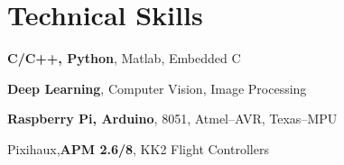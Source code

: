 \halfblankline

\section{Technical Skills}
\begin{innerlist}
    \item \textbf{C/C++, Python}, Matlab, Embedded C
    \item \textbf{Deep Learning}, Computer Vision, Image Processing
    \item \textbf{Raspberry Pi, Arduino}, 8051, Atmel--AVR, Texas--MPU
    \item Pixihaux,\textbf{APM 2.6/8}, KK2 Flight Controllers
\end{innerlist}

\halfblankline



